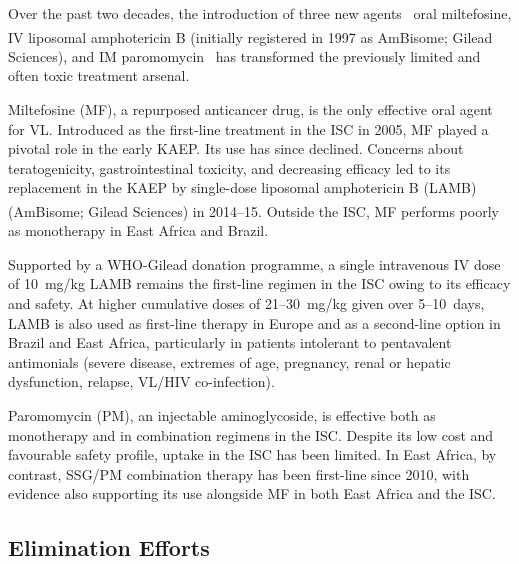 Over the past two decades, the introduction of three new agents \textemdash\ oral miltefosine, IV liposomal amphotericin B (initially registered in 1997 as AmBisome\textsuperscript{\textregistered}; Gilead Sciences), and IM paromomycin \textemdash\  has transformed the previously limited and often toxic treatment arsenal\cite{alves2018}.

Miltefosine (MF), a repurposed anticancer drug, is the only effective oral agent for VL. Introduced as the first-line treatment in the ISC in 2005, MF played a pivotal role in the early KAEP\cite{sundar2002,bhattacharya2007,who_sea_elim2005}. Its use has since declined. Concerns about teratogenicity, gastrointestinal toxicity, and decreasing efficacy\cite{rijal2013,sundar2012} led to its replacement in the KAEP by single-dose liposomal amphotericin B (LAMB) (AmBisome\textsuperscript{\textregistered}; Gilead Sciences) in 2014--15\cite{chatterjee2025}. Outside the ISC, MF performs poorly as monotherapy in East Africa and Brazil\cite{alves2018, carnielli2019}.

Supported by a WHO-Gilead donation programme, a single intravenous IV dose of 10~mg/kg LAMB remains the first-line regimen in the ISC owing to its efficacy and safety\cite{WHO2023GileadAgreement}. At higher cumulative doses of 21--30~mg/kg given over 5--10~days, LAMB is also used as first-line therapy in Europe and as a second-line option in Brazil and East Africa, particularly in patients intolerant to pentavalent antimonials (severe disease, extremes of age, pregnancy, renal or hepatic dysfunction, relapse, VL/HIV co-infection).

Paromomycin (PM), an injectable aminoglycoside, is effective both as monotherapy and in combination regimens in the ISC\cite{sundar2007a}. Despite its low cost and favourable safety profile, uptake in the ISC has been limited. In East Africa, by contrast, SSG/PM combination therapy has been first-line since 2010\cite{WHO_TRS_949_2010,musa2012}, with evidence also supporting its use alongside MF in both East Africa and the ISC\cite{musa2023,sundar2011comb}.

\subsection{Elimination Efforts}

